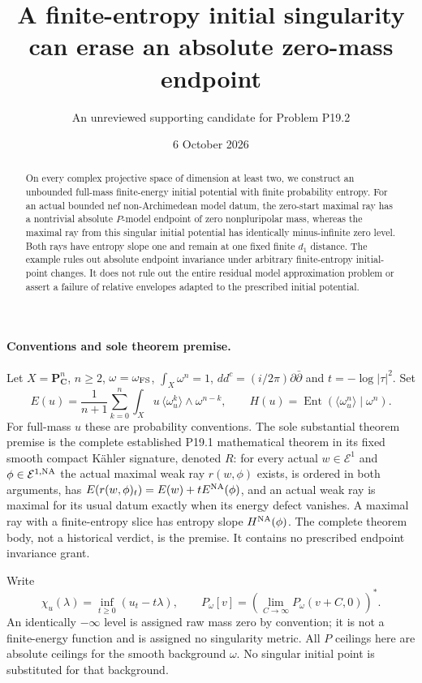\documentclass[10pt]{article}
\title{A finite-entropy initial singularity can erase an absolute zero-mass endpoint}
\author{An unreviewed supporting candidate for Problem P19.2}
\date{6 October 2026}
\newcommand{\ddc}{dd^c}
\newcommand{\PP}{\mathbf P}
\begin{document}
\maketitle
\begin{abstract}
On every complex projective space of dimension at least two, we construct
an unbounded full-mass finite-energy initial potential with finite
probability entropy. For an actual bounded nef non-Archimedean model datum,
the zero-start maximal ray has a nontrivial absolute $P$-model endpoint
of zero nonpluripolar mass, whereas the maximal ray from this singular
initial potential has identically minus-infinite zero level. Both rays
have entropy slope one and remain at one fixed finite $d_1$ distance.
The example rules out absolute endpoint invariance under arbitrary
finite-entropy initial-point changes. It does not rule out the entire
residual model approximation problem or assert a failure of relative
envelopes adapted to the prescribed initial potential.
\end{abstract}

\paragraph{Conventions and sole theorem premise.}
Let $X=\PP^n_{\mathbf C}$, $n\geq2$, $\omega=\omega_{\rm FS}$,
$\int_X\omega^n=1$, $\ddc=(i/2\pi)\partial\bar\partial$ and
$t=-\log|\tau|^2$. Set
\[
 E(u)=\frac1{n+1}\sum_{k=0}^n\int_Xu\,
        \langle\omega_u^k\rangle\wedge\omega^{n-k},\qquad
 H(u)=\operatorname{Ent}(\langle\omega_u^n\rangle\mid\omega^n).
\]
For full-mass $u$ these are probability conventions. The sole substantial
theorem premise is the complete established P19.1 mathematical theorem
in its fixed smooth compact K\"ahler signature, denoted $R$: for every
actual $w\in\mathcal E^1$ and $\phi\in\mathcal E^{1,\rm NA}$ the
actual maximal weak ray $r(w,\phi)$ exists, is ordered in both arguments,
has $E(r(w,\phi)_t)=E(w)+tE^{\rm NA}(\phi)$, and an actual weak ray
is maximal for its usual datum exactly when its energy defect vanishes.
A maximal ray with a finite-entropy slice has entropy slope
$H^{\rm NA}(\phi)$. The complete theorem body, not a historical verdict,
is the premise. It contains no prescribed endpoint invariance grant.

Write
\[
 \chi_u(\lambda)=\inf_{t\geq0}(u_t-t\lambda),\qquad
 P_\omega[v]=\left(\lim_{C\to\infty}P_\omega(v+C,0)\right)^*.
\]
An identically $-\infty$ level is assigned raw mass zero by convention;
it is not a finite-energy function and is assigned no singularity metric.
All $P$ ceilings here are absolute ceilings for the smooth background
$\omega$. No singular initial point is substituted for that background.
\end{document}

